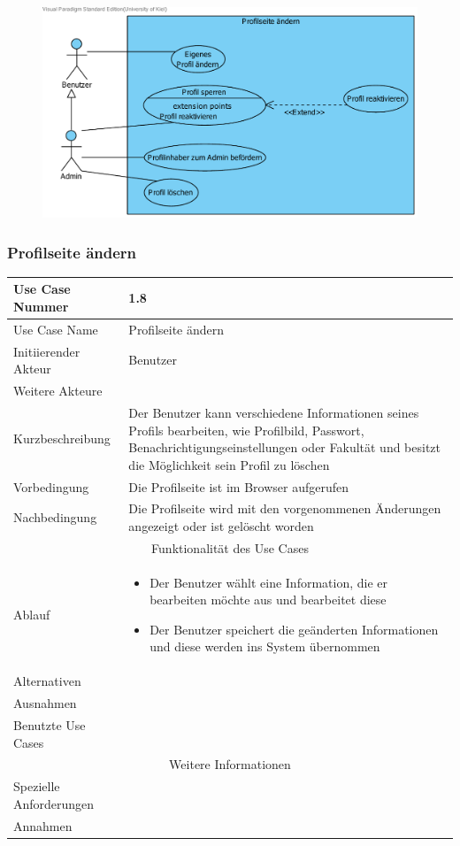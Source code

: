 \documentclass[10pt,a4paper]{article}
\begin{document}
	\begin{figure}[H]
		\includegraphics[width=\linewidth]{gfx/webseite/Profilseite.pdf}
	\end{figure}
	\subsubsection{Profilseite \"andern}
		\begin{tabularx}{\textwidth}{|l|X|}
		\hline Use Case Nummer & 1.8 \\ 
		\hline Use Case Name & Profilseite \"andern \\ 
		\hline Initiierender Akteur & Benutzer \\
		\hline Weitere Akteure & \\
		\hline Kurzbeschreibung & Der Benutzer kann verschiedene Informationen seines Profils bearbeiten, wie Profilbild, Passwort, Benachrichtigungseinstellungen oder Fakultät und besitzt die Möglichkeit sein Profil zu löschen \\
		\hline Vorbedingung & Die Profilseite ist im Browser aufgerufen \\
		\hline Nachbedingung & Die Profilseite wird mit den vorgenommenen \"Anderungen angezeigt oder ist gel\"oscht worden \\
		\hline \multicolumn{2}{|c|}{Funktionalität des Use Cases}\\
		\hline Ablauf & \begin{itemize}
					\item Der Benutzer w\"ahlt eine Information, die er bearbeiten m\"ochte aus und bearbeitet diese
					\item Der Benutzer speichert die ge\"anderten Informationen und diese werden ins System \"ubernommen
				\end{itemize}\\
		\hline Alternativen & \\
		\hline Ausnahmen & \\
		\hline Benutzte Use Cases & \\
		\hline \multicolumn{2}{|c|}{Weitere Informationen} \\
		\hline Spezielle Anforderungen &  \\
		\hline Annahmen &  \\
		\hline
		\end{tabularx}
		
\end{document}
